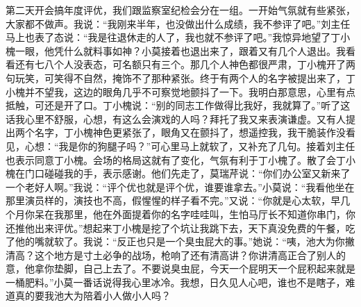 \documentclass[12pt,oneside]{book}
\begin{document}
第二天开会搞年度评优，我们跟监察室纪检会分在一组。一开始气氛就有些紧张，大家都不做声。我说：``我刚来半年，也没做出什么成绩，我不参评了吧。''刘主任马上也表了态说：``我是往退休走的人了，我也就不参评了吧。''我惊异地望了丁小槐一眼，他凭什么就料事如神？小莫接着也退出来了，跟着又有几个人退出。我看看还有七八个人没表态，可名额只有三个。那几个人神色都很严肃，丁小槐开了两句玩笑，可笑得不自然，掩饰不了那种紧张。终于有两个人的名字被提出来了，丁小槐并不望我，这边的眼角几乎不可察觉地颤抖了一下。我明白那意思，心里有点抵触，可还是开了口。丁小槐说：``别的同志工作做得比我好，我就算了。''听了这话我心里不舒服，心想，有这么会演戏的人吗？拜托了我又来表演谦虚。又有人提出两个名字，丁小槐神色更紧张了，眼角又在颤抖了，想遥控我，我干脆装作没看见，心想：``我是你的狗腿子吗？''可心里马上就软了，又补充了几句。接着刘主任也表示同意丁小槐。会场的格局这就有了变化，气氛有利于丁小槐了。散了会丁小槐在门口碰碰我的手，表示感谢。他们先走了，莫瑞芹说：``你们办公室又新来了一个老好人啊。''我说：``评个优也就是评个优，谁要谁拿去。''小莫说：``我看他坐在那里演员样的，演技也不高，假惺惺的样子看不完。''又说：``你就是心太软，早几个月你呆在我那里，他在外面提着你的名字哇哇叫，生怕马厅长不知道你串门，你还推他出来评优。''想起来丁小槐是挖了个坑让我跳下去，天下真没免费的午餐，吃了他的嘴就软了。我说：``反正也只是一个臭虫屁大的事。''她说：``咦，池大为你撇清高？这个地方是寸土必争的战场，枪响了还有清高讲？你讲清高正合了别人的意，他拿你垫脚，自己上去了。不要说臭虫屁，今天一个屁明天一个屁积起来就是一桶肥料。''小莫一番话说得我心里冰冷。我想，日久见人心吧，谁也不是瞎子，难道真的要我池大为陪着小人做小人吗？
\end{document}
